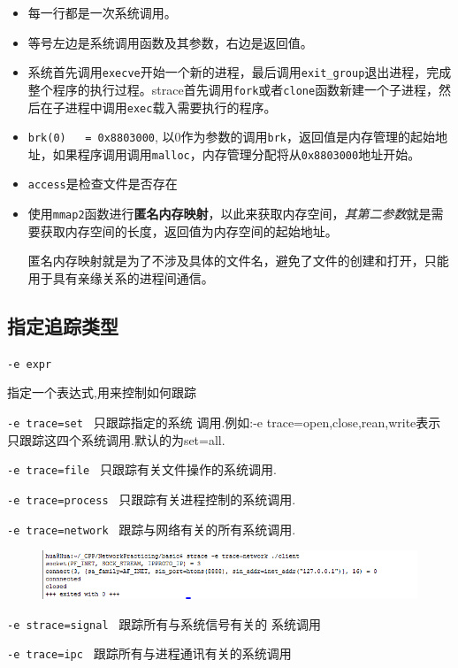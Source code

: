 \documentclass[UTF8,a4paper,12pt]{ctexbook}
\begin{document}
		\begin{itemize}
			\item 每一行都是一次系统调用。
			\item 等号左边是系统调用函数及其参数，右边是返回值。
			\item 系统首先调用\verb|execve|开始一个新的进程，最后调用\verb|exit_group|退出进程，完成整个程序的执行过程。strace首先调用\verb|fork|或者\verb|clone|函数新建一个子进程，然后在子进程中调用\verb|exec|载入需要执行的程序。
			\item \verb|brk(0)   = 0x8803000|, 以0作为参数的调用\verb|brk|，返回值是内存管理的起始地址，如果程序调用调用\verb|malloc|，内存管理分配将从\verb|0x8803000|地址开始。
			\item \verb|access|是检查文件是否存在
			\item 使用\verb|mmap2|函数进行\textbf{匿名内存映射}，以此来获取内存空间，\textit{其第二参数}就是需要获取内存空间的长度，返回值为内存空间的起始地址。
			
			匿名内存映射就是为了不涉及具体的文件名，避免了文件的创建和打开，只能用于具有亲缘关系的进程间通信。
		\end{itemize}
		
		\subsection{指定追踪类型}
			\verb|-e expr|
			
			指定一个表达式,用来控制如何跟踪
			
			\verb|-e trace=set |
			只跟踪指定的系统 调用.例如:-e trace=open,close,rean,write表示只跟踪这四个系统调用.默认的为set=all. 
			
			\verb|-e trace=file |
			只跟踪有关文件操作的系统调用. 
			
			\verb|-e trace=process |
			只跟踪有关进程控制的系统调用. 
			
			\verb|-e trace=network |
			跟踪与网络有关的所有系统调用. 
				\begin{figure}[h]
					\centering
					\includegraphics[scale = 0.6]{figures/strace-Net.png}
				\end{figure}
				
			\verb|-e strace=signal |
			跟踪所有与系统信号有关的 系统调用 
			
			\verb|-e trace=ipc |
			跟踪所有与进程通讯有关的系统调用 
		
\end{document}
